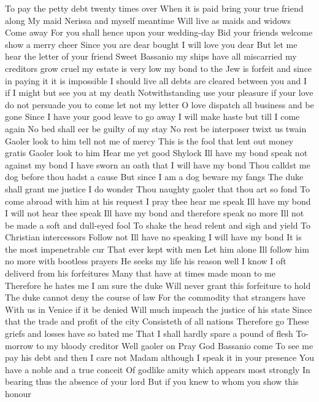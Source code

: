 To pay the petty debt twenty times over 
When it is paid bring your true friend along 
My maid Nerissa and myself meantime 
Will live as maids and widows Come away 
For you shall hence upon your wedding-day 
Bid your friends welcome show a merry cheer 
Since you are dear bought I will love you dear 
But let me hear the letter of your friend 
Sweet Bassanio my ships have all 
miscarried my creditors grow cruel my estate is 
very low my bond to the Jew is forfeit and since 
in paying it it is impossible I should live all 
debts are cleared between you and I if I might but 
see you at my death Notwithstanding use your 
pleasure if your love do not persuade you to come 
let not my letter 
O love dispatch all business and be gone 
Since I have your good leave to go away 
I will make haste but till I come again 
No bed shall eer be guilty of my stay 
No rest be interposer twixt us twain 
Gaoler look to him tell not me of mercy 
This is the fool that lent out money gratis 
Gaoler look to him 
Hear me yet good Shylock 
Ill have my bond speak not against my bond 
I have sworn an oath that I will have my bond 
Thou calldst me dog before thou hadst a cause 
But since I am a dog beware my fangs 
The duke shall grant me justice I do wonder 
Thou naughty gaoler that thou art so fond 
To come abroad with him at his request 
I pray thee hear me speak 
Ill have my bond I will not hear thee speak 
Ill have my bond and therefore speak no more 
Ill not be made a soft and dull-eyed fool 
To shake the head relent and sigh and yield 
To Christian intercessors Follow not 
Ill have no speaking I will have my bond 
It is the most impenetrable cur 
That ever kept with men 
Let him alone 
Ill follow him no more with bootless prayers 
He seeks my life his reason well I know 
I oft deliverd from his forfeitures 
Many that have at times made moan to me 
Therefore he hates me 
I am sure the duke 
Will never grant this forfeiture to hold 
The duke cannot deny the course of law 
For the commodity that strangers have 
With us in Venice if it be denied 
Will much impeach the justice of his state 
Since that the trade and profit of the city 
Consisteth of all nations Therefore go 
These griefs and losses have so bated me 
That I shall hardly spare a pound of flesh 
To-morrow to my bloody creditor 
Well gaoler on Pray God Bassanio come 
To see me pay his debt and then I care not 
Madam although I speak it in your presence 
You have a noble and a true conceit 
Of godlike amity which appears most strongly 
In bearing thus the absence of your lord 
But if you knew to whom you show this honour 
